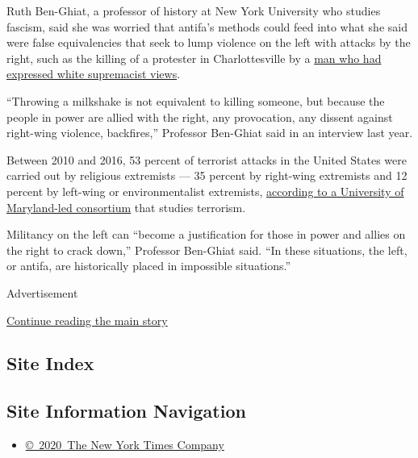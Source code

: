 Ruth Ben-Ghiat, a professor of history at New York University who
studies fascism, said she was worried that antifa's methods could feed
into what she said were false equivalencies that seek to lump violence
on the left with attacks by the right, such as the killing of a
protester in Charlottesville by a
\href{https://www.nytimes3xbfgragh.onion/2019/03/27/us/james-alex-fields-charlottesville.html}{man
who had expressed white supremacist views}.

``Throwing a milkshake is not equivalent to killing someone, but because
the people in power are allied with the right, any provocation, any
dissent against right-wing violence, backfires,'' Professor Ben-Ghiat
said in an interview last year.

Between 2010 and 2016, 53 percent of terrorist attacks in the United
States were carried out by religious extremists --- 35 percent by
right-wing extremists and 12 percent by left-wing or environmentalist
extremists,
\href{https://www.start.umd.edu/pubs/START_IdeologicalMotivationsOfTerrorismInUS_Nov2017.pdf}{according
to a University of Maryland-led consortium} that studies terrorism.

Militancy on the left can ``become a justification for those in power
and allies on the right to crack down,'' Professor Ben-Ghiat said. ``In
these situations, the left, or antifa, are historically placed in
impossible situations.''

Advertisement

\protect\hyperlink{after-bottom}{Continue reading the main story}

\hypertarget{site-index}{%
\subsection{Site Index}\label{site-index}}

\hypertarget{site-information-navigation}{%
\subsection{Site Information
Navigation}\label{site-information-navigation}}

\begin{itemize}
\tightlist
\item
  \href{https://help.nytimes3xbfgragh.onion/hc/en-us/articles/115014792127-Copyright-notice}{©~2020~The
  New York Times Company}
\end{itemize}

